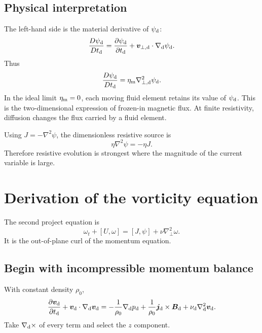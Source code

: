 \documentclass[11pt]{article}
\newcommand{\vect}[1]{\bm{#1}}
\newcommand{\bracket}[2]{\left[#1,#2\right]}
\newcommand{\Lap}{\nabla_{\!\perp}^{2}}
\begin{document}
\subsection{Physical interpretation}

The left-hand side is the material derivative of $\psi_{\rm d}$:
\begin{equation}
\frac{D\psi_{\rm d}}{Dt_{\rm d}}
=\frac{\partial\psi_{\rm d}}{\partial t_{\rm d}}
+\vect{v}_{\perp,\rm d}\cdot\nabla_{\rm d}\psi_{\rm d}.
\end{equation}
Thus
\begin{equation}
\frac{D\psi_{\rm d}}{Dt_{\rm d}}
=\eta_{\rm m}\nabla_{\perp,\rm d}^{2}\psi_{\rm d}.
\end{equation}
In the ideal limit $\eta_{\rm m}=0$, each moving fluid element retains its value of $\psi_{\rm d}$. This is the two-dimensional expression of frozen-in magnetic flux. At finite resistivity, diffusion changes the flux carried by a fluid element.

Using $J=-\nabla^2\psi$, the dimensionless resistive source is
\begin{equation}
\eta\nabla^2\psi=-\eta J.
\end{equation}
Therefore resistive evolution is strongest where the magnitude of the current variable is large.

\section{Derivation of the vorticity equation}
\label{sec:vorticityderivation}

The second project equation is
\begin{equation}
\omega_t+\bracket{U}{\omega}
=\bracket{J}{\psi}+\nu\Lap\omega.
\label{eq:vorticityproject_preview}
\end{equation}
It is the out-of-plane curl of the momentum equation.

\subsection{Begin with incompressible momentum balance}

With constant density $\rho_0$,
\begin{equation}
\frac{\partial\vect{v}_{\rm d}}{\partial t_{\rm d}}
+\vect{v}_{\rm d}\cdot\nabla_{\rm d}\vect{v}_{\rm d}
=-\frac{1}{\rho_0}\nabla_{\rm d}p_{\rm d}
+\frac{1}{\rho_0}\vect{j}_{\rm d}\times\vect{B}_{\rm d}
+\nu_{\rm d}\nabla_{\rm d}^{2}\vect{v}_{\rm d}.
\label{eq:momentum_incompressible}
\end{equation}
Take $\nabla_{\rm d}\times$ of every term and select the $z$ component.
\end{document}
